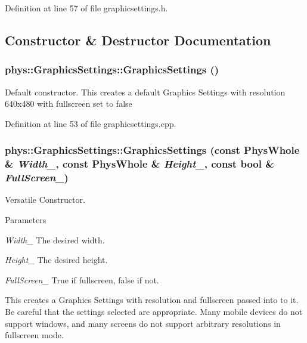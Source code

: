 Definition at line 57 of file graphicsettings.h.

\subsection{Constructor \& Destructor Documentation}
\hypertarget{classphys_1_1GraphicsSettings_aceaaf53585413067adbf271e2c1e48fa}{
\subsubsection[{GraphicsSettings}]{\setlength{\rightskip}{0pt plus 5cm}phys::GraphicsSettings::GraphicsSettings ()}}
\label{dc/df1/classphys_1_1GraphicsSettings_aceaaf53585413067adbf271e2c1e48fa}


Default constructor. This creates a default Graphics Settings with resolution 640x480 with fullscreen set to false 

Definition at line 53 of file graphicsettings.cpp.\hypertarget{classphys_1_1GraphicsSettings_a58d20902f41ddf10db9f9a810a3910cc}{
\subsubsection[{GraphicsSettings}]{\setlength{\rightskip}{0pt plus 5cm}phys::GraphicsSettings::GraphicsSettings (const PhysWhole \& {\em Width\_\-}, \/  const PhysWhole \& {\em Height\_\-}, \/  const bool \& {\em FullScreen\_\-})}}
\label{dc/df1/classphys_1_1GraphicsSettings_a58d20902f41ddf10db9f9a810a3910cc}


Versatile Constructor. 
\begin{DoxyParams}{Parameters}
\item[{\em Width\_\-}]The desired width. \item[{\em Height\_\-}]The desired height. \item[{\em FullScreen\_\-}]True if fullscreen, false if not.\end{DoxyParams}
This creates a Graphics Settings with resolution and fullscreen passed into to it. Be careful that the settings selected are appropriate. Many mobile devices do not support windows, and many screens do not support arbitrary resolutions in fullscreen mode. 

